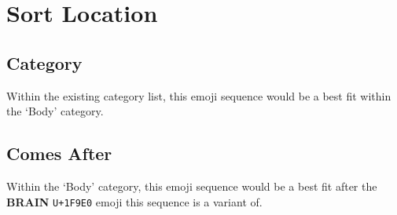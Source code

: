 \section{Sort Location}

\subsection{Category}

Within the existing category list, this emoji sequence would be a best fit within the `Body' category.

\subsection{Comes After}

Within the `Body' category, this emoji sequence would be a best fit after the \textbf{BRAIN} \texttt{U+1F9E0} emoji this sequence is a variant of.
